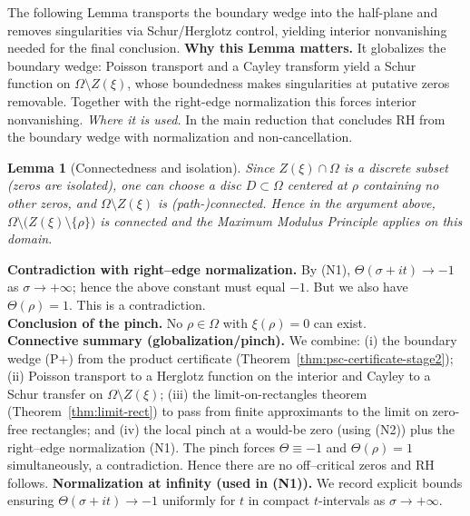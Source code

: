 \documentclass[11pt]{article}
\newtheorem{lemma}{Lemma}[section]
\theoremstyle{definition}
\theoremstyle{remark}
\begin{document}
\vspace{0.77cm}
\noindent The following Lemma transports the boundary wedge into the half-plane and
removes singularities via Schur/Herglotz control, yielding interior nonvanishing needed for the final conclusion.
\noindent\textbf{Why this Lemma matters.} It globalizes the boundary wedge: Poisson transport and a Cayley transform yield a Schur function on $\Omega\setminus Z(\xi)$, whose boundedness makes singularities at putative zeros removable. Together with the right-edge normalization this forces interior nonvanishing.
\noindent\textit{Where it is used.} In the main reduction that concludes RH from the boundary wedge with normalization and non-cancellation.
\begin{lemma}[Connectedness and isolation]
\label{rem:connectedness}
  Since $Z(\xi)\cap\Omega$ is a discrete subset (zeros are isolated),
  one can choose a disc $D\subset\Omega$ centered at $\rho$ containing no other zeros,
  and $\Omega\setminus Z(\xi)$ is (path-)connected.
  Hence in the argument above, $\Omega\setminus\big(Z(\xi)\setminus\{\rho\}\big)$ is connected
  and the Maximum Modulus Principle applies on this domain.
\end{lemma}
\noindent\textbf{Contradiction with right--edge normalization.}
By (N1), $\Theta(\sigma+it)\to-1$ as $\sigma\to+\infty$; hence the above constant must equal $-1$.
But we also have $\Theta(\rho)=1$. This is a contradiction.
\\ %
\noindent\textbf{Conclusion of the pinch.}
No $\rho\in\Omega$ with $\xi(\rho)=0$ can exist.
\\ %
\noindent\textbf{Connective summary (globalization/pinch).}
We combine: (i) the boundary wedge (P+) from the product certificate (Theorem~\ref{thm:psc-certificate-stage2}); (ii) Poisson transport to a Herglotz function on the interior and Cayley to a Schur transfer on $\Omega\setminus Z(\xi)$; (iii) the limit-on-rectangles theorem (Theorem~\ref{thm:limit-rect}) to pass from finite approximants to the limit on zero-free rectangles; and (iv) the local pinch at a would-be zero (using (N2)) plus the right–edge normalization (N1). The pinch forces $\Theta\equiv -1$ and $\Theta(\rho)=1$ simultaneously, a contradiction. Hence there are no off–critical zeros and RH follows.
\medskip
\noindent\textbf{Normalization at infinity (used in (N1)).}
We record explicit bounds ensuring $\Theta(\sigma+it)\to-1$ uniformly for $t$ in compact $t$-intervals as $\sigma\to+\infty$.
\end{document}
